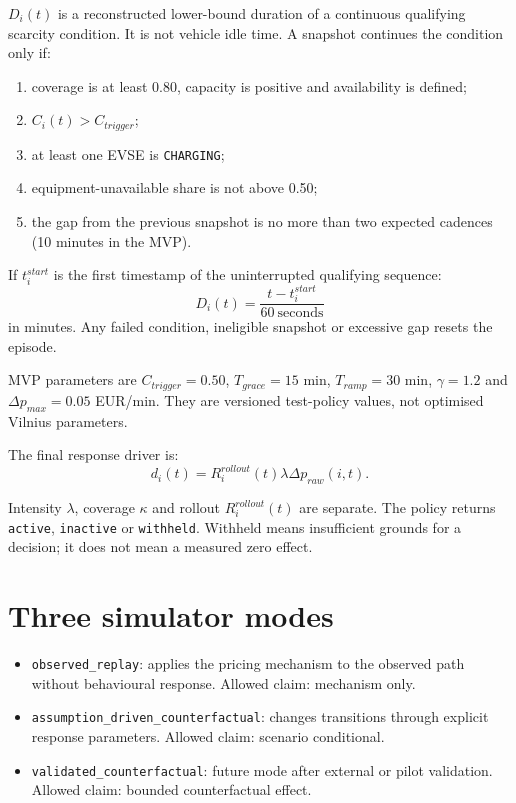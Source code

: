 \documentclass[11pt,a4paper]{article}
\newcommand{\code}[1]{\texttt{#1}}
\begin{document}
$D_i(t)$ is a reconstructed lower-bound duration of a continuous qualifying scarcity condition. It is not vehicle idle time. A snapshot continues the condition only if:
\begin{enumerate}
\item coverage is at least 0.80, capacity is positive and availability is defined;
\item $C_i(t)>C_{trigger}$;
\item at least one EVSE is \code{CHARGING};
\item equipment-unavailable share is not above 0.50;
\item the gap from the previous snapshot is no more than two expected cadences (10 minutes in the MVP).
\end{enumerate}

If $t_i^{start}$ is the first timestamp of the uninterrupted qualifying sequence:
\[
D_i(t)=\frac{t-t_i^{start}}{60\ \text{seconds}}
\]
in minutes. Any failed condition, ineligible snapshot or excessive gap resets the episode.

MVP parameters are $C_{trigger}=0.50$, $T_{grace}=15$ min, $T_{ramp}=30$ min, $\gamma=1.2$ and $\Delta p_{max}=0.05$ EUR/min. They are versioned test-policy values, not optimised Vilnius parameters.

The final response driver is:
\[
d_i(t)=R_i^{rollout}(t)\lambda\Delta p_{raw}(i,t).
\]

Intensity $\lambda$, coverage $\kappa$ and rollout $R_i^{rollout}(t)$ are separate. The policy returns \code{active}, \code{inactive} or \code{withheld}. Withheld means insufficient grounds for a decision; it does not mean a measured zero effect.

\section{Three simulator modes}

\begin{itemize}
\item \code{observed\_replay}: applies the pricing mechanism to the observed path without behavioural response. Allowed claim: mechanism only.
\item \code{assumption\_driven\_counterfactual}: changes transitions through explicit response parameters. Allowed claim: scenario conditional.
\item \code{validated\_counterfactual}: future mode after external or pilot validation. Allowed claim: bounded counterfactual effect.
\end{itemize}
\end{document}

